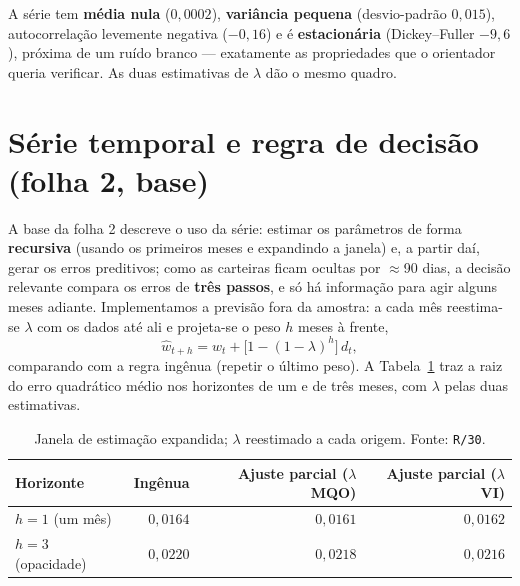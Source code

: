 \documentclass[11pt,a4paper]{article}
\begin{document}
A série tem \textbf{média nula} ($0{,}0002$), \textbf{variância pequena} (desvio-padrão $0{,}015$),
autocorrelação levemente negativa ($-0{,}16$) e é \textbf{estacionária} (Dickey--Fuller $-9{,}6$),
próxima de um ruído branco --- exatamente as propriedades que o orientador queria verificar. As
duas estimativas de $\lambda$ dão o mesmo quadro.

\section{Série temporal e regra de decisão (folha 2, base)}

A base da folha 2 descreve o uso da série: estimar os parâmetros de forma \textbf{recursiva} (usando
os primeiros meses e expandindo a janela) e, a partir daí, gerar os erros preditivos; como as
carteiras ficam ocultas por $\approx$90 dias, a decisão relevante compara os erros de \textbf{três
passos}, e só há informação para agir alguns meses adiante. Implementamos a previsão fora da
amostra: a cada mês reestima-se $\lambda$ com os dados até ali e projeta-se o peso $h$ meses à
frente,
\begin{equation}
\widehat{w}_{t+h} = w_t + \big[1-(1-\lambda)^h\big]\,d_t ,
\label{eq:fc_h}
\end{equation}
comparando com a regra ingênua (repetir o último peso). A Tabela~\ref{tab:udecis} traz a raiz do
erro quadrático médio nos horizontes de um e de três meses, com $\lambda$ pelas duas estimativas.

\begin{table}[h]\centering\small
\caption{Previsão recursiva fora da amostra pelo ajuste parcial (raiz do erro quadrático médio).}
\label{tab:udecis}
\begin{tabular}{@{}lrrr@{}}
\toprule
Horizonte & Ingênua & Ajuste parcial ($\lambda$ MQO) & Ajuste parcial ($\lambda$ VI) \\
\midrule
$h=1$ (um mês)     & $0{,}0164$ & $0{,}0161$ & $0{,}0162$ \\
$h=3$ (opacidade)  & $0{,}0220$ & $0{,}0218$ & $0{,}0216$ \\
\bottomrule
\end{tabular}
\caption*{\footnotesize Janela de estimação expandida; $\lambda$ reestimado a cada origem. Fonte:
\texttt{R/30}.}
\end{table}
\end{document}

